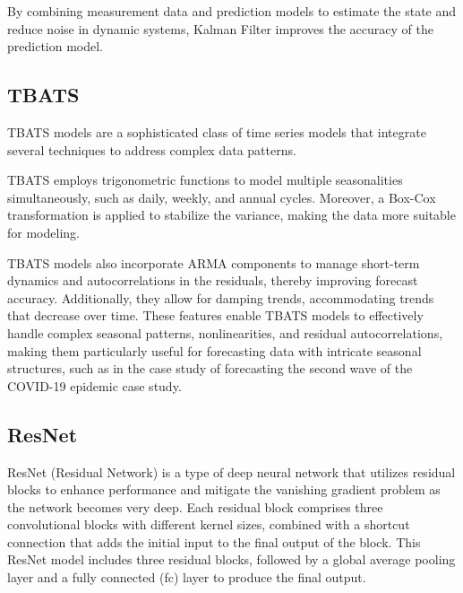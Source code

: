 \documentclass[conference]{IEEEtran}
\begin{document}
By combining measurement data and prediction models to estimate the state and reduce noise in dynamic systems, Kalman Filter improves the accuracy of the prediction model.
\subsection{TBATS}  
TBATS models are a sophisticated class of time series models that integrate several techniques to address complex data patterns. 

TBATS employs trigonometric functions to model multiple seasonalities simultaneously, such as daily, weekly, and annual cycles. Moreover, a Box-Cox transformation is applied to stabilize the variance, making the data more suitable for modeling.

TBATS models also incorporate ARMA components to manage short-term dynamics and autocorrelations in the residuals, thereby improving forecast accuracy. Additionally, they allow for damping trends, accommodating trends that decrease over time. These features enable TBATS models to effectively handle complex seasonal patterns, nonlinearities, and residual autocorrelations, making them particularly useful for forecasting data with intricate seasonal structures, such as in the case study of forecasting the second wave of the COVID-19 epidemic case study.\cite{b5}

\subsection{ResNet}  
ResNet (Residual Network) is a type of deep neural network that utilizes residual blocks to enhance performance and mitigate the vanishing gradient problem as the network becomes very deep. Each residual block comprises three convolutional blocks with different kernel sizes, combined with a shortcut connection that adds the initial input to the final output of the block. This ResNet model includes three residual blocks, followed by a global average pooling layer and a fully connected (fc) layer to produce the final output. \cite{b6}
\end{document}
